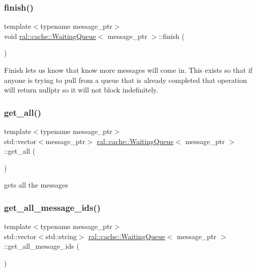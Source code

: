 \subsubsection{\texorpdfstring{finish()}{finish()}}
{\footnotesize\ttfamily template$<$typename message\+\_\+ptr$>$ \\
void \hyperlink{classral_1_1cache_1_1WaitingQueue}{ral\+::cache\+::\+Waiting\+Queue}$<$ message\+\_\+ptr $>$\+::finish (\begin{DoxyParamCaption}{ }\end{DoxyParamCaption})\hspace{0.3cm}{\ttfamily [inline]}}

Finish lets us know that know more messages will come in. This exists so that if anyone is trying to pull from a queue that is already completed that operation will return nullptr so it will not block indefinitely. \mbox{\label{classral_1_1cache_1_1WaitingQueue_a51a2c83824c2f9eefe8b938a19793645}} 
\subsubsection{\texorpdfstring{get\+\_\+all()}{get\_all()}}
{\footnotesize\ttfamily template$<$typename message\+\_\+ptr$>$ \\
std\+::vector$<$message\+\_\+ptr$>$ \hyperlink{classral_1_1cache_1_1WaitingQueue}{ral\+::cache\+::\+Waiting\+Queue}$<$ message\+\_\+ptr $>$\+::get\+\_\+all (\begin{DoxyParamCaption}{ }\end{DoxyParamCaption})\hspace{0.3cm}{\ttfamily [inline]}}

gets all the messages \mbox{\label{classral_1_1cache_1_1WaitingQueue_ace97207416c27ecbe0d356c096edb499}} 
\subsubsection{\texorpdfstring{get\+\_\+all\+\_\+message\+\_\+ids()}{get\_all\_message\_ids()}}
{\footnotesize\ttfamily template$<$typename message\+\_\+ptr$>$ \\
std\+::vector$<$std\+::string$>$ \hyperlink{classral_1_1cache_1_1WaitingQueue}{ral\+::cache\+::\+Waiting\+Queue}$<$ message\+\_\+ptr $>$\+::get\+\_\+all\+\_\+message\+\_\+ids (\begin{DoxyParamCaption}{ }\end{DoxyParamCaption})\hspace{0.3cm}{\ttfamily [inline]}}

